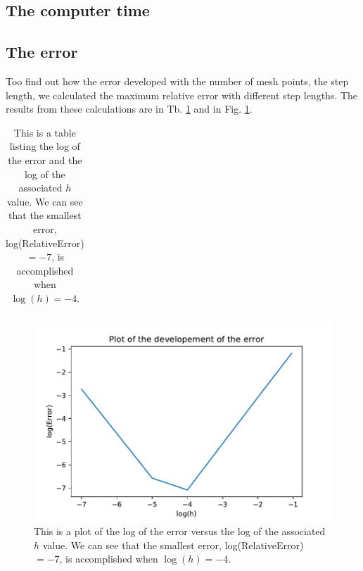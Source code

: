\subsection{The computer time}

\subsection{The error}

Too find out how the error developed with the number of mesh points, the step length, we calculated the maximum relative error with different step lengths. The results from these calculations are in Tb. \ref{tab:error_developement} and in Fig. \ref{fig:error_development}. 

\begin{table}[H]\caption{This is a table listing the log of the error and the log of the associated $h$ value. We can see that the smallest error, log(RelativeError) $= -7$, is accomplished when $\log(h) = -4$.}\label{tab:error_developement}
\begin{tabular}{cc}

\end{tabular}
\end{table}

\begin{figure}[H]
\includegraphics[width=\linewidth]{figures/ErrorDevelopement.pdf}\caption{This is a plot of the log of the error versus the log of the associated $h$ value. We can see that the smallest error, log(RelativeError) $= -7$, is accomplished when $\log(h) = -4$.}\label{fig:error_development}
\end{figure}
